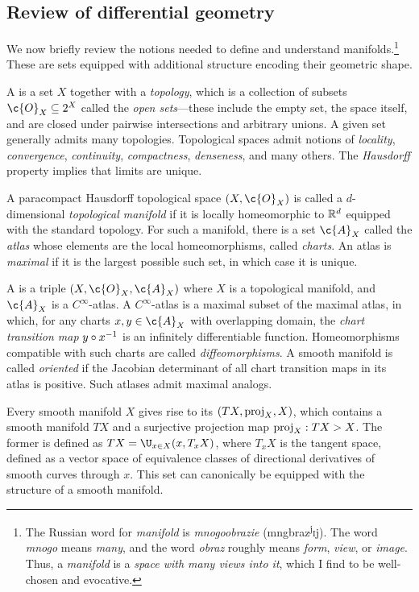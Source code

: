 \documentclass[11pt]{book}
\begin{document}
\subsection{Review of differential geometry}
We now briefly review the notions needed to define and understand manifolds.\footnote{The Russian word for \emph{manifold} is \emph{mnogoobrazie} (mngbr{\textquotesingle}az\textsuperscript{j}\textsc{i}j). The word \emph{mnogo} means \emph{many}, and the word \emph{obraz} roughly means \emph{form}, \emph{view}, or \emph{image}. 
Thus, a \emph{manifold} is a \emph{space with many views into it}, which I find to be well-chosen and evocative.}
These are sets equipped with additional structure encoding their geometric shape.

A  is a set $X$ together with a \emph{topology}, which is a collection of subsets $\c{O}_X \subseteq 2^X$ called the \emph{open sets}---these include the empty set, the space itself, and are closed under pairwise intersections and arbitrary unions.
A given set generally admits many topologies.
Topological spaces admit notions of \emph{locality}, \emph{convergence}, \emph{continuity}, \emph{compactness}, \emph{denseness}, and many others.
The \emph{Hausdorff} property implies that limits are unique.

A paracompact Hausdorff topological space $(X,\c{O}_X)$ is called a $d$-dimensional \emph{topological manifold} if it is locally homeomorphic to $\mathbb{R}^d$ equipped with the standard topology.
For such a manifold, there is a set $\c{A}_X$ called the \emph{atlas} whose elements are the local homeomorphisms, called \emph{charts}.
An atlas is \emph{maximal} if it is the largest possible such set, in which case it is unique.

A  is a triple  $(X,\c{O}_X,\c{A}_X)$ where $X$ is a topological manifold, and $\c{A}_X$ is a $C^\infty$-atlas.
A $C^\infty$-atlas is a maximal subset of the maximal atlas, in which, for any charts $x,y \in \c{A}_X$ with overlapping domain, the \emph{chart transition map} $y\circ x^{-1}$ is an infinitely differentiable function.
Homeomorphisms compatible with such charts are called \emph{diffeomorphisms}.
A smooth manifold is called \emph{oriented} if the Jacobian determinant of all chart transition maps in its atlas is positive.
Such atlases admit maximal analogs.

Every smooth manifold $X$ gives rise to its  $(TX,\operatorname{proj}_X,X)$, which contains a smooth manifold $TX$ and a surjective projection map $\operatorname{proj}_X : TX \-> X$.
The former is defined as $TX = \U_{x\in X} (x,T_x X)$, where $T_x X$ is the tangent space, defined as a vector space of equivalence classes of directional derivatives of smooth curves through $x$.
This set can canonically be equipped with the structure of a smooth manifold.
\end{document}
